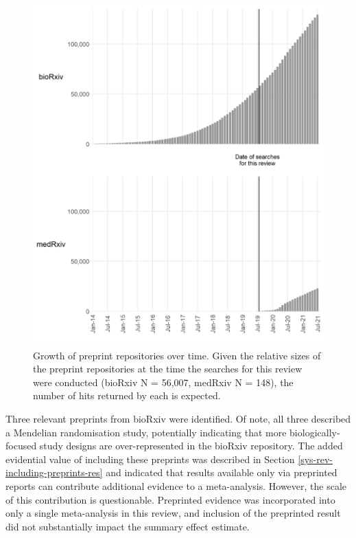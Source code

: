 \documentclass[a4paper, twoside]{templates/ociamthesis}
\begin{document}
\begin{figure}[H]

{\centering \includegraphics[width=0.8\linewidth]{figures/sys-rev/preprint_growth} 

}

\caption[Growth of preprint repositories over time]{Growth of preprint repositories over time. Given the relative sizes of the preprint repositories at the time the searches for this review were conducted (bioRxiv N = 56,007, medRxiv N = 148), the number of hits returned by each is expected.}\label{fig:preprintGrowth}
\end{figure}

Three relevant preprints from bioRxiv were identified. Of note, all three described a Mendelian randomisation study, potentially indicating that more biologically-focused study designs are over-represented in the bioRxiv repository. The added evidential value of including these preprints was described in Section \ref{sys-rev-including-preprints-res} and indicated that results available only via preprinted reports can contribute additional evidence to a meta-analysis. However, the scale of this contribution is questionable. Preprinted evidence was incorporated into only a single meta-analysis in this review, and inclusion of the preprinted result did not substantially impact the summary effect estimate.
\end{document}
